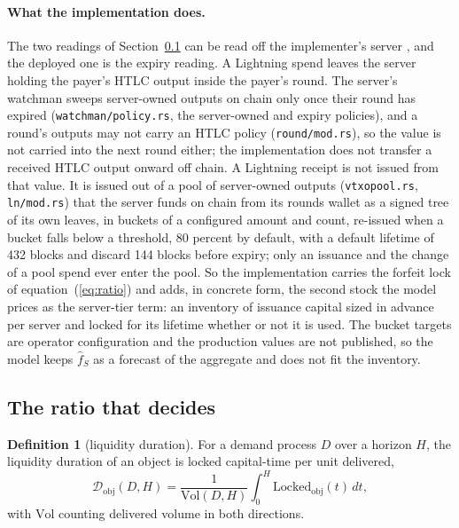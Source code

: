 \documentclass[11pt]{article}
\theoremstyle{plain}
\theoremstyle{definition}
\newtheorem{definition}{Definition}
\theoremstyle{remark}
\newcommand{\Dur}{\mathcal{D}}
\begin{document}
\paragraph{What the implementation does.} The two readings of Section~\ref{sec:ratio} can be read off the implementer's server \citep{bark2026}, and the deployed one is the expiry reading. A Lightning spend leaves the server holding the payer's HTLC output inside the payer's round. The server's watchman sweeps server-owned outputs on chain only once their round has expired (\texttt{watchman/policy.rs}, the server-owned and expiry policies), and a round's outputs may not carry an HTLC policy (\texttt{round/mod.rs}), so the value is not carried into the next round either; the implementation does not transfer a received HTLC output onward off chain. A Lightning receipt is not issued from that value. It is issued out of a pool of server-owned outputs (\texttt{vtxopool.rs}, \texttt{ln/mod.rs}) that the server funds on chain from its rounds wallet as a signed tree of its own leaves, in buckets of a configured amount and count, re-issued when a bucket falls below a threshold, 80 percent by default, with a default lifetime of 432 blocks and discard 144 blocks before expiry; only an issuance and the change of a pool spend ever enter the pool. So the implementation carries the forfeit lock of equation~(\ref{eq:ratio}) and adds, in concrete form, the second stock the model prices as the server-tier term: an inventory of issuance capital sized in advance per server and locked for its lifetime whether or not it is used. The bucket targets are operator configuration and the production values are not published, so the model keeps $\hat f_S$ as a forecast of the aggregate and does not fit the inventory.

\subsection{The ratio that decides}
\label{sec:ratio}

\begin{definition}[liquidity duration]
For a demand process $D$ over a horizon $H$, the liquidity duration of an object is locked capital-time per unit delivered,
\[
\Dur_{\mathrm{obj}}(D,H)=\frac{1}{\mathrm{Vol}(D,H)}\int_0^H \mathrm{Locked}_{\mathrm{obj}}(t)\,dt,
\]
with $\mathrm{Vol}$ counting delivered volume in both directions.
\end{definition}
\end{document}
